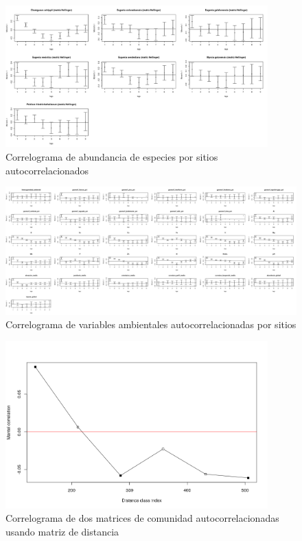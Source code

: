 \documentclass[11pt,]{article}
\begin{document}
\begin{figure}
\centering
\includegraphics[width=0.90000\textwidth]{correl_abu_esp_sitios.png}
\caption{Correlograma de abundancia de especies por sitios
autocorrelacionados\label{fig:correlog_espc}}
\end{figure}

\begin{figure}
\centering
\includegraphics[width=1.00000\textwidth]{amb_corrl.png}
\caption{Correlograma de variables ambientales autocorrelacionadas por
sitios\label{fig:amb_correl}}
\end{figure}

\begin{figure}
\centering
\includegraphics[width=0.90000\textwidth]{mantel_dist_corr.png}
\caption{Correlograma de dos matrices de comunidad autocorrelacionadas
usando matriz de distancia\label{fig:mantel_distancia}}
\end{figure}
\end{document}
